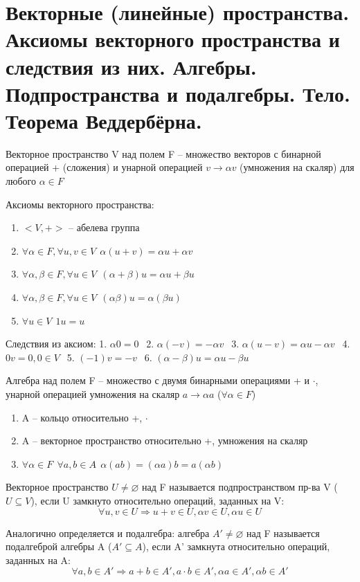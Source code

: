\documentclass{article}
\begin{document}
\section{Векторные (линейные) пространства. Аксиомы векторного пространства и следствия из них. Алгебры. Подпространства и подалгебры. Тело. Теорема Веддербёрна.}

\textsf{Векторное пространство V над полем F – множество векторов с бинарной операцией + (сложения) и унарной операцией $v\to\alpha v$ (умножения на скаляр) для любого $\alpha\in F$}

Аксиомы векторного пространства:
\begin{enumerate}
    \item $<V, +>$ – абелева группа
    \item $\forall\alpha\in F, \forall u,v\in V\ \ \alpha(u+v)=\alpha u+\alpha v$
    \item $\forall\alpha,\beta\in F, \forall u\in V\ \ (\alpha+\beta)u=\alpha u+\beta u$
    \item $\forall\alpha,\beta\in F, \forall u\in V\ \ (\alpha\beta)u=\alpha(\beta u)$
    \item $\forall u\in V\ \ 1u=u$
\end{enumerate}

Следствия из аксиом:
1. $\alpha 0=0\ \ $
2. $\alpha (-v)=-\alpha v\ \ $
3. $\alpha(u-v)=\alpha u-\alpha v\ \ $
4. $0v=0, 0\in V\ \ $
5. $(-1)v=-v\ \ $
6. $(\alpha-\beta)u=\alpha u-\beta u$

\textsf{Алгебра} над полем F – множество с двумя бинарными операциями + и $\cdot$, унарной операцией умножения на скаляр $a\to\alpha a$ ($\forall\alpha\in F$)
\begin{enumerate}
    \item A – кольцо относительно +, $\cdot$
    \item A – векторное пространство относительно +, умножения на скаляр
    \item $\forall\alpha\in F\ \ \forall a,b\in A\ \ \alpha(ab)=(\alpha a)b=a(\alpha b)$
\end{enumerate}

Векторное пространство $U\neq \varnothing$ над F называется \textsf{подпространством} пр-ва V ($U\subseteq V$), если U замкнуто относительно операций, заданных на V:
$$\forall u,v\in U\Rightarrow u+v\in U, \alpha v\in U, \alpha u\in U$$

Аналогично определяется и \textsf{подалгебра}:
алгебра $A'\neq \varnothing$ над F называется \textsf{подалгеброй} алгебры A ($A'\subseteq A$), если A' замкнута относительно операций, заданных на A:
$$\forall a,b\in A'\Rightarrow a+b\in A', a\cdot b\in A', \alpha a\in A', \alpha b\in A'$$
\end{document}
